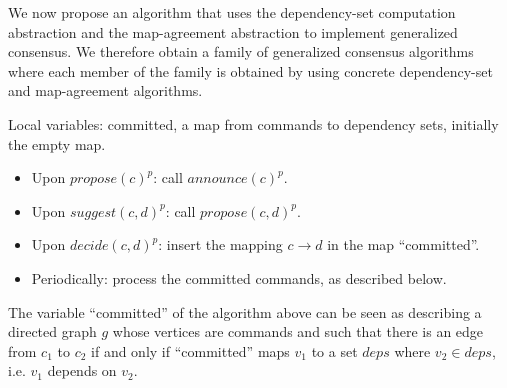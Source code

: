 We now propose an algorithm that uses the dependency-set computation abstraction and the map-agreement abstraction to implement generalized consensus. We therefore obtain a family of generalized consensus algorithms where each member of the family is obtained by using concrete dependency-set and map-agreement algorithms.

Local variables: committed, a map from commands to dependency sets, initially the empty map.
\begin{itemize}[noitemsep,nolistsep]
    \item Upon ${propose\left( c \right)}^p$: call ${announce\left( c \right)}^p$.
    \item Upon ${suggest\left( c,d \right)}^p$: call ${propose\left( c,d \right)}^p$.
    \item Upon ${decide\left( c,d \right)}^p$: insert the mapping $c \rightarrow d$ in the map ``committed''.
    \item Periodically: process the committed commands, as described below.
\end{itemize}

The variable ``committed'' of the algorithm above can be seen as describing a directed graph $g$ whose vertices are commands and such that there is an edge from $c_1$ to $c_2$ if and only if ``committed'' maps $v_1$ to a set $deps$ where $v_2\in deps$, i.e. $v_1$ depends on $v_2$.



\printbibliography%


